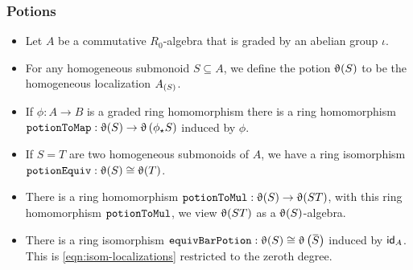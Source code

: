 \documentclass[9pt]{beamer}
\begin{document}



\begin{frame}[fragile]
  \frametitle{Potions}
\begin{itemize}
  \item<1-> 
  Let $A$ be a commutative $R_0$-algebra that is graded by an abelian group $\iota$. 
  \item For any homogeneous submonoid $S \subseteq A$, we define the potion $\operatorname{\upvartheta}(S)$ to be the 
  homogeneous localization ${A}_{\left(S\right)}$.
  \item<2-> If $\phi : A \to B$ is a graded ring homomorphism there is a ring homomorphism
  ${\footnotesize{\mathtt{potionToMap}}}: \operatorname{\upvartheta}(S) \to \operatorname{\upvartheta}\left(\phi_{\star} S\right)$ induced by $\phi$.
  \item<3-> If $S = T$ are two homogeneous submonoids of $A$, we have a ring isomorphism ${\footnotesize{\mathtt{potionEquiv}}}: \operatorname{\upvartheta}(S) \cong \operatorname{\upvartheta}(T)$.
  \item<4-> There is a ring homomorphism ${\footnotesize{\mathtt{potionToMul}}}:\operatorname{\upvartheta}(S) \to \operatorname{\upvartheta}(ST)$,
  with this ring homomorphism ${\footnotesize{\mathtt{potionToMul}}}$, we view $\operatorname{\upvartheta}(ST)$ as a $\operatorname{\upvartheta}(S)$-algebra.
  \item<5-> There is a ring isomorphism $\leanmath{equivBarPotion}: \potion(S) \cong \potion\left( \mybar{S} \right)$ induced by $\mathsf{id}_A$. This is \cref{eqn:isom-localizations} restricted to the zeroth degree.
\end{itemize}

\end{frame}
\end{document}
